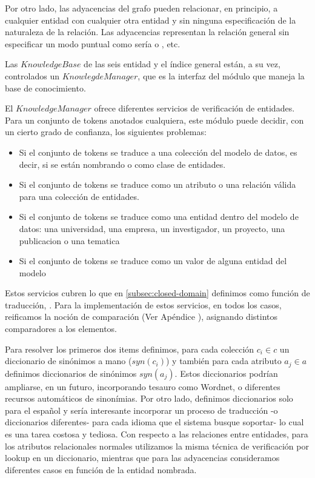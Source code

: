 Por otro lado, las adyacencias del grafo pueden relacionar, en principio, a cualquier entidad con cualquier otra entidad y sin ninguna especificación de la naturaleza de la relación. Las adyacencias representan la relación general  sin especificar un modo puntual como sería  o , etc. 

Las $KnowledgeBase$ de las seis entidad y el índice general están, a su vez, controlados un $KnowlegdeManager$, que es la interfaz del módulo que maneja la base de conocimiento. 

El $KnowledgeManager$ ofrece diferentes servicios de verificación de entidades. Para un conjunto de tokens {\color{red}anotados} cualquiera, este módulo puede decidir, con un cierto grado de confianza, los siguientes problemas:

\begin{itemize}
  \item Si el conjunto de tokens se traduce a una colección del modelo de datos, es decir, si se están nombrando  o  como clase de entidades.
  \item Si el conjunto de tokens se traduce como un atributo o una relación válida para una colección de entidades.
  \item Si el conjunto de tokens se traduce como una entidad dentro del modelo de datos: una universidad, una empresa, un investigador, un proyecto, una publicacion o una tematica
  \item Si el conjunto de tokens se traduce como un valor de alguna entidad del modelo
\end{itemize}

Estos servicios cubren lo que en \ref{subsec:closed-domain} definimos como función de traducción, \tradqd. Para la implementación de estos servicios, en todos los casos, reificamos la noción de comparación (Ver Apéndice ), asignando distintos comparadores a los elementos. 

Para resolver los primeros dos items definimos, para cada colección $c_i \in c$ un diccionario de sinónimos a mano ($syn(c_i)$) y también para cada atributo $a_j \in a$ definimos diccionarios de sinónimos $syn(a_j)$. Estos diccionarios podrían ampliarse, en un futuro, incorporando tesauro como Wordnet, o diferentes recursos automáticos de sinonímias. Por otro lado, definimos diccionarios solo para el español y sería interesante incorporar un proceso de traducción -o diccionarios diferentes- para cada idioma que el sistema busque soportar- lo cual es una tarea costosa y tediosa. Con respecto a las relaciones entre entidades, para los atributos relacionales normales utilizamos la misma técnica de verificación por lookup en un diccionario, mientras que para las adyacencias consideramos diferentes casos en función de la entidad nombrada.

